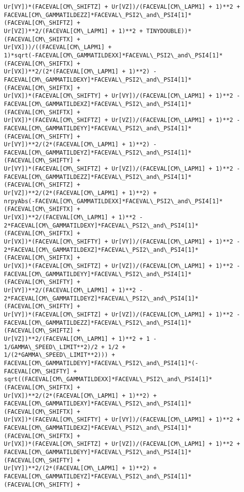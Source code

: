 \documentclass[landscape,letterpaper,10pt,english]{article}
\begin{document}
\begin{Verbatim}[commandchars=\\\{\}]
Ur[VY])*(FACEVAL[CM\_SHIFTZ] + Ur[VZ])/(FACEVAL[CM\_LAPM1] + 1)**2 +
FACEVAL[CM\_GAMMATILDEZZ]*FACEVAL\_PSI2\_and\_PSI4[1]*(FACEVAL[CM\_SHIFTZ] +
Ur[VZ])**2/(FACEVAL[CM\_LAPM1] + 1)**2 + TINYDOUBLE))*(FACEVAL[CM\_SHIFTX] +
Ur[VX]))/((FACEVAL[CM\_LAPM1] +
1)*sqrt(-FACEVAL[CM\_GAMMATILDEXX]*FACEVAL\_PSI2\_and\_PSI4[1]*(FACEVAL[CM\_SHIFTX] +
Ur[VX])**2/(2*(FACEVAL[CM\_LAPM1] + 1)**2) -
FACEVAL[CM\_GAMMATILDEXY]*FACEVAL\_PSI2\_and\_PSI4[1]*(FACEVAL[CM\_SHIFTX] +
Ur[VX])*(FACEVAL[CM\_SHIFTY] + Ur[VY])/(FACEVAL[CM\_LAPM1] + 1)**2 -
FACEVAL[CM\_GAMMATILDEXZ]*FACEVAL\_PSI2\_and\_PSI4[1]*(FACEVAL[CM\_SHIFTX] +
Ur[VX])*(FACEVAL[CM\_SHIFTZ] + Ur[VZ])/(FACEVAL[CM\_LAPM1] + 1)**2 -
FACEVAL[CM\_GAMMATILDEYY]*FACEVAL\_PSI2\_and\_PSI4[1]*(FACEVAL[CM\_SHIFTY] +
Ur[VY])**2/(2*(FACEVAL[CM\_LAPM1] + 1)**2) -
FACEVAL[CM\_GAMMATILDEYZ]*FACEVAL\_PSI2\_and\_PSI4[1]*(FACEVAL[CM\_SHIFTY] +
Ur[VY])*(FACEVAL[CM\_SHIFTZ] + Ur[VZ])/(FACEVAL[CM\_LAPM1] + 1)**2 -
FACEVAL[CM\_GAMMATILDEZZ]*FACEVAL\_PSI2\_and\_PSI4[1]*(FACEVAL[CM\_SHIFTZ] +
Ur[VZ])**2/(2*(FACEVAL[CM\_LAPM1] + 1)**2) +
nrpyAbs(-FACEVAL[CM\_GAMMATILDEXX]*FACEVAL\_PSI2\_and\_PSI4[1]*(FACEVAL[CM\_SHIFTX] +
Ur[VX])**2/(FACEVAL[CM\_LAPM1] + 1)**2 -
2*FACEVAL[CM\_GAMMATILDEXY]*FACEVAL\_PSI2\_and\_PSI4[1]*(FACEVAL[CM\_SHIFTX] +
Ur[VX])*(FACEVAL[CM\_SHIFTY] + Ur[VY])/(FACEVAL[CM\_LAPM1] + 1)**2 -
2*FACEVAL[CM\_GAMMATILDEXZ]*FACEVAL\_PSI2\_and\_PSI4[1]*(FACEVAL[CM\_SHIFTX] +
Ur[VX])*(FACEVAL[CM\_SHIFTZ] + Ur[VZ])/(FACEVAL[CM\_LAPM1] + 1)**2 -
FACEVAL[CM\_GAMMATILDEYY]*FACEVAL\_PSI2\_and\_PSI4[1]*(FACEVAL[CM\_SHIFTY] +
Ur[VY])**2/(FACEVAL[CM\_LAPM1] + 1)**2 -
2*FACEVAL[CM\_GAMMATILDEYZ]*FACEVAL\_PSI2\_and\_PSI4[1]*(FACEVAL[CM\_SHIFTY] +
Ur[VY])*(FACEVAL[CM\_SHIFTZ] + Ur[VZ])/(FACEVAL[CM\_LAPM1] + 1)**2 -
FACEVAL[CM\_GAMMATILDEZZ]*FACEVAL\_PSI2\_and\_PSI4[1]*(FACEVAL[CM\_SHIFTZ] +
Ur[VZ])**2/(FACEVAL[CM\_LAPM1] + 1)**2 + 1 - 1/GAMMA\_SPEED\_LIMIT**2)/2 + 1/2 +
1/(2*GAMMA\_SPEED\_LIMIT**2))) +
FACEVAL[CM\_GAMMATILDEYY]*FACEVAL\_PSI2\_and\_PSI4[1]*(-FACEVAL[CM\_SHIFTY] +
sqrt((FACEVAL[CM\_GAMMATILDEXX]*FACEVAL\_PSI2\_and\_PSI4[1]*(FACEVAL[CM\_SHIFTX] +
Ur[VX])**2/(2*(FACEVAL[CM\_LAPM1] + 1)**2) +
FACEVAL[CM\_GAMMATILDEXY]*FACEVAL\_PSI2\_and\_PSI4[1]*(FACEVAL[CM\_SHIFTX] +
Ur[VX])*(FACEVAL[CM\_SHIFTY] + Ur[VY])/(FACEVAL[CM\_LAPM1] + 1)**2 +
FACEVAL[CM\_GAMMATILDEXZ]*FACEVAL\_PSI2\_and\_PSI4[1]*(FACEVAL[CM\_SHIFTX] +
Ur[VX])*(FACEVAL[CM\_SHIFTZ] + Ur[VZ])/(FACEVAL[CM\_LAPM1] + 1)**2 +
FACEVAL[CM\_GAMMATILDEYY]*FACEVAL\_PSI2\_and\_PSI4[1]*(FACEVAL[CM\_SHIFTY] +
Ur[VY])**2/(2*(FACEVAL[CM\_LAPM1] + 1)**2) +
FACEVAL[CM\_GAMMATILDEYZ]*FACEVAL\_PSI2\_and\_PSI4[1]*(FACEVAL[CM\_SHIFTY] +

\end{Verbatim}
\end{document}

